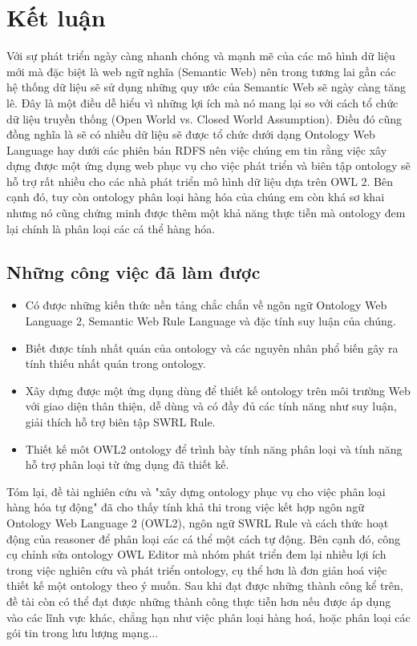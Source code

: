 \chapter{Kết luận}
Với sự phát triển ngày càng nhanh chóng và mạnh mẽ của các mô hình dữ liệu mới mà đặc biệt là web ngữ nghĩa (Semantic Web) nên trong tương lai gần các hệ thống dữ liệu sẽ sử dụng những quy ước của Semantic Web sẽ ngày càng tăng lê. Đây là một điều dễ hiểu vì những lợi ích mà nó mang lại so với cách tổ chức dữ liệu truyền thống (Open World vs. Closed World Assumption). Điều đó cũng đồng nghĩa là sẽ có nhiều dữ liệu sẽ được tổ chức dưới dạng Ontology Web Language hay dưới các phiên bản RDFS nên việc chúng em tin rằng việc xây dựng được một ứng dụng web phục vụ cho việc phát triển và biên tập ontology sẽ hỗ trợ rất nhiều cho các nhà phát triển mô hình dữ liệu dựa trên OWL 2. Bên cạnh đó, tuy còn ontology phân loại hàng hóa của chúng em còn khá sơ khai nhưng nó cũng chứng minh được thêm một khả năng thực tiễn mà ontology đem lại chính là phân loại các cá thể hàng hóa.
\section{Những công việc đã làm được}
\begin{itemize}
\item Có được những kiến thức nền tảng chắc chắn về ngôn ngữ Ontology Web Language 2, Semantic Web Rule Language và đặc tính suy luận của chúng.
\item Biết được tính nhất quán của ontology  và các nguyên nhân phổ biến gây ra tính thiếu nhất quán trong ontology.
\item Xây dựng được một ứng dụng dùng để thiết kế ontology trên môi trường Web với giao diện thân thiện, dễ dùng và có đầy đủ các tính năng như suy luận, giải thích hỗ trợ biên tập SWRL Rule.
\item Thiết kế môt OWL2 ontology để trình bày tính năng phân loại và tính năng hỗ trợ phân loại từ ứng dụng đã thiết kế.
\end{itemize}
Tóm lại, đề tài nghiên cứu và "xây dựng ontology phục vụ cho việc phân loại hàng hóa tự động" đã cho thấy tính khả thi trong việc kết hợp ngôn ngữ Ontology Web Language 2 (OWL2), ngôn ngữ SWRL Rule và cách thức hoạt động của reasoner để phân loại các cá thể một cách tự động. Bên cạnh đó, công cụ chỉnh sửa ontology OWL Editor mà nhóm phát triển đem lại nhiều lợi ích trong việc nghiên cứu và phát triển ontology, cụ thể hơn là đơn giản hoá việc thiết kế một ontology theo ý muốn. Sau khi đạt được những thành công kể trên, đề tài còn có thể đạt được những thành công thực tiễn hơn nếu được áp dụng vào các lĩnh vực khác, chẳng hạn như việc phân loại hàng hoá, hoặc phân loại các gói tin trong lưu lượng mạng... 
